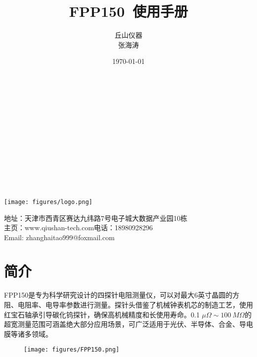 \documentclass[12pt]{ctexart}
\title{\color{red}FPP150\ 使用手册}
\author{\large 丘山仪器\\张海涛}
\date{\today}
\begin{document}
\maketitle

~\\
~\\
~\\
~\\
~\\
~\\
~\\
~\\
~\\
~\\
\renewcommand{\headrulewidth}{1.5pt}%
\renewcommand{\footrulewidth}{1.5pt}


\begin{center}
\texttt{[image: figures/logo.png]}

\end{center}
\begin{center}


{\color{blue} 地址：天津市西青区赛达九纬路7号电子城大数据产业园10栋\\
主页：www.qiushan-tech.com\qquad 电话：18980928296\\
Email: zhanghaitao999@foxmail.com\\}
\end{center}
\newpage
\tableofcontents
\newpage

\section{简介}
FPP150是专为科学研究设计的四探针电阻测量仪，可以对最大6英寸晶圆的方阻、电阻率、电导率参数进行测量。探针头借鉴了机械钟表机芯的制造工艺，使用红宝石轴承引导碳化钨探针，确保高机械精度和长使用寿命。0.1 $\mu\Omega\sim 100\ M\Omega$的超宽测量范围可涵盖绝大部分应用场景，可广泛适用于光伏、半导体、合金、导电膜等诸多领域。\cite[]{S1359645418305408.bib}

\begin{figure}[H]
	\centering
	\texttt{[image: figures/FPP150.png]}
\end{figure}
\end{document}

